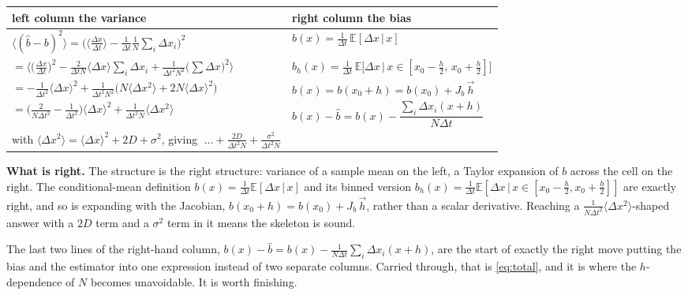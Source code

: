 \documentclass[11pt,a4paper]{article}
\newcommand{\dx}{\Delta x}
\newcommand{\dt}{\Delta t}
\newcommand{\E}{\mathbb{E}}
\begin{document}
\begin{center}
\small
\begin{tabular}{@{}L{0.49\textwidth}L{0.45\textwidth}@{}}
\toprule
\textbf{left column \textemdash{} the variance} & \textbf{right column \textemdash{} the bias} \\
\midrule
$\big\langle(\hat b-b)^{2}\big\rangle
 = \Big(\big\langle\tfrac{\dx}{\dt}\big\rangle-\tfrac{1}{\dt}\tfrac{1}{N}\sum_i\dx_i\Big)^{2}$
&
$b(x)=\tfrac{1}{\dt}\,\E[\dx\,|\,x]$ \\[0.35em]
$=\big\langle \big(\tfrac{\dx}{\dt}\big)^{2}
  -\tfrac{2}{\dt N}\langle\dx\rangle\textstyle\sum_i\dx_i
  +\tfrac{1}{\dt^{2}N^{2}}\big(\sum\dx\big)^{2}\big\rangle$
&
$b_h(x)=\tfrac{1}{\dt}\,\E\big[\dx\,\big|\,x\in[x_0-\tfrac h2,\,x_0+\tfrac h2]\big]$ \\[0.35em]
$=-\tfrac{1}{\dt^{2}}\langle\dx\rangle^{2}
  +\tfrac{1}{\dt^{2}N^{2}}\big(N\langle\dx^{2}\rangle+2N\langle\dx\rangle^{2}\big)$
&
$b(x)=b(x_0+h)=b(x_0)+J_b\,\vec h$ \\[0.35em]
$=\big(\tfrac{2}{N\dt^{2}}-\tfrac{1}{\dt^{2}}\big)\langle\dx\rangle^{2}
  +\tfrac{1}{\dt^{2}N}\langle\dx^{2}\rangle$
&
$b(x)-\hat b = b(x)-\dfrac{\sum_i\dx_i(x+h)}{N\dt}$ \\[0.35em]
with $\langle\dx^{2}\rangle=\langle\dx\rangle^{2}+2D+\sigma^{2}$, giving
$\;\ldots+\tfrac{2D}{\dt^{2}N}+\tfrac{\sigma^{2}}{\dt^{2}N}$
& \\
\bottomrule
\end{tabular}
\end{center}

\textbf{What is right.} The structure is the right structure: variance of a sample mean
on the left, a Taylor expansion of $b$ across the cell on the right. The conditional-mean
definition $b(x)=\frac{1}{\dt}\E[\dx\,|\,x]$ and its binned version
$b_h(x)=\frac{1}{\dt}\E[\dx\,|\,x\in[x_0-\tfrac h2,x_0+\tfrac h2]]$ are exactly right,
and so is expanding with the Jacobian, $b(x_0+h)=b(x_0)+J_b\,\vec h$, rather than a
scalar derivative. Reaching a $\frac{1}{N\dt^{2}}\langle\dx^{2}\rangle$-shaped answer
with a $2D$ term and a $\sigma^{2}$ term in it means the skeleton is sound.

The last two lines of the right-hand column,
$b(x)-\hat b = b(x)-\frac{1}{N\dt}\sum_i\dx_i(x+h)$, are the start of exactly the right
move \textemdash{} putting the bias and the estimator into one expression instead of two
separate columns. Carried through, that is \eqref{eq:total}, and it is where the
$h$-dependence of $N$ becomes unavoidable. It is worth finishing.
\end{document}
